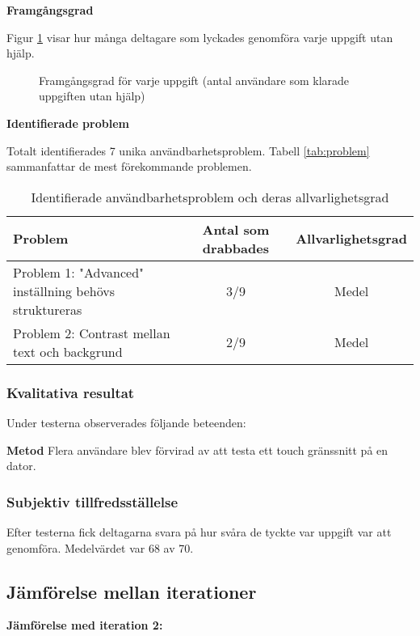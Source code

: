 \textbf{Framgångsgrad}

Figur \ref{fig:success_rate2} visar hur många deltagare som lyckades genomföra varje uppgift utan hjälp.

\begin{figure}[ht]
    \centering
    \caption{Framgångsgrad för varje uppgift (antal användare som klarade uppgiften utan hjälp)}
    \label{fig:success_rate2}
\end{figure}

\textbf{Identifierade problem}

Totalt identifierades 7 unika användbarhetsproblem. Tabell \ref{tab:problem} sammanfattar de mest förekommande problemen.
\begin{table}[H]
\centering
\begin{tabular}{|p{6cm}|c|c|}
\hline
\textbf{Problem} & \textbf{Antal som drabbades} & \textbf{Allvarlighetsgrad} \\
\hline
Problem 1: "Advanced" inställning behövs struktureras & 3/9 & Medel\\
Problem 2: Contrast mellan text och backgrund & 2/9 &  Medel \\
\hline
\end{tabular}
\caption{Identifierade användbarhetsproblem och deras allvarlighetsgrad}
\label{tab:problem2}
\end{table}


\subsubsection{Kvalitativa resultat}

Under testerna observerades följande beteenden:

\textbf{Metod} Flera användare blev förvirad av att testa ett touch gränssnitt på en dator. 

\subsubsection{Subjektiv tillfredsställelse}

Efter testerna fick deltagarna svara på hur svåra de tyckte var uppgift var att genomföra. Medelvärdet var 68 av 70.


\subsection{Jämförelse mellan iterationer}
\textbf{Jämförelse med iteration 2:}

